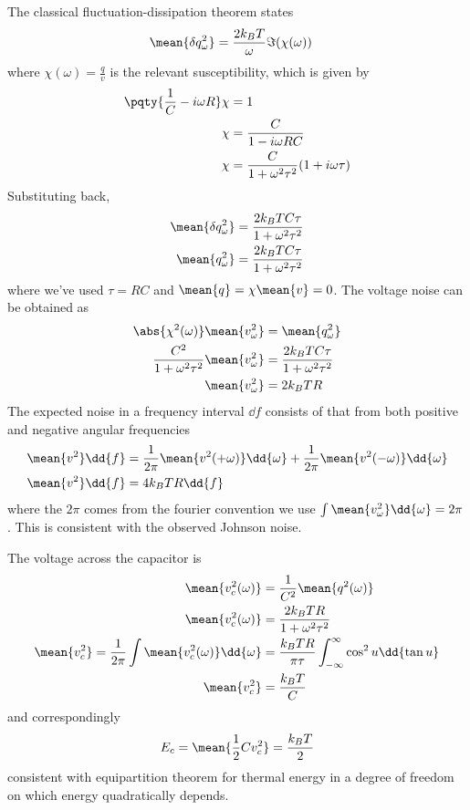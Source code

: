 \documentclass[12pt]{article}
\begin{document}
     \subsection{} The classical fluctuation-dissipation theorem states \begin{align*}
        \mean{\delta q^2_\omega} &= \frac{2 k_B T}{\omega} \Im( \chi(\omega))
    \end{align*}
    where \(\chi(\omega) = \frac{q}{v}\) is the relevant susceptibility, which is given by \begin{align*}
        \pqty{\frac{1}{C} - i\omega R}\chi &=  1\\
        \chi &= \frac{C}{1 - i\omega RC}\\
        \chi &= \frac{C}{1 + \omega^2 \tau^2}(1 + i\omega \tau)
    \end{align*}
    Substituting back, \begin{align*}
        \mean{\delta q^2_\omega} &=  \frac{2 k_B T C \tau }{1 + \omega^2 \tau^2}\\
        \mean{q^2_\omega} &=  \frac{2 k_B T C \tau }{1 + \omega^2 \tau^2} 
    \end{align*}
    where we've used \(\tau = RC\) and \(\mean{q} = \chi \mean{v} = 0\). The voltage noise can be obtained as \begin{align*}
        \abs{\chi^2(\omega)} \mean{v_\omega^2} &= \mean{q_\omega^2}\\
        \frac{C^2}{1 + \omega^2 \tau^2} \mean{v_\omega^2} &= \frac{2 k_B T C \tau }{1 + \omega^2 \tau^2} \\
        \mean{v_\omega^2} &= 2 k_B T R
    \end{align*}
    The expected noise in a frequency interval \(\dd{f}\) consists of that from both positive and negative angular frequencies \begin{align*}
        \mean{v^2} \dd{f}&= \frac{1}{2\pi}\mean{v^2( + \omega)} \dd{\omega} + \frac{1}{2\pi}\mean{v^2( -\omega)} \dd{\omega}\\
        \mean{v^2} \dd{f}&= 4 k_B T R  \dd{f}
    \end{align*}
    where the \(2\pi\) comes from the fourier convention we use \(\int \mean{v_\omega^2} \dd{\omega} = 2\pi\). This is consistent with the observed Johnson noise.

    The voltage across the capacitor is \begin{align*}
        \mean{v_c^2(\omega)} &= \frac{1}{C^2} \mean{q^2(\omega)}\\
        \mean{v_c^2(\omega)} &= \frac{2 k_B T R}{1 + \omega^2 \tau^2} \\
        \mean{v_c^2} =\frac{1}{2\pi} \int \mean{v_c^2(\omega)}\dd{\omega} &= \frac{k_B T R}{\pi\tau}  \int_{ - \infty}^\infty \cos^2 u \dd{ \tan u}\\
        \mean{v_c^2} &= \frac{k_B T }{C} 
    \end{align*}
    and correspondingly \[
        E_c = \mean{\frac{1}{2}C v_c^2} = \frac{k_BT}{2} 
    \] consistent with equipartition theorem for thermal energy in a degree of freedom on which energy quadratically depends. 
\end{document}

